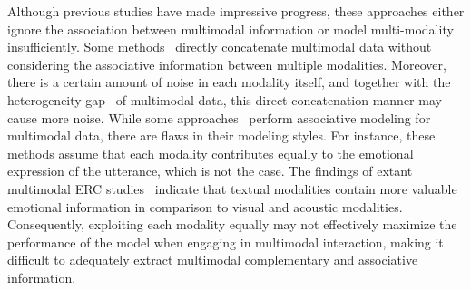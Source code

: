 \documentclass[journal]{IEEEtran}
\begin{document}
Although previous studies have made impressive progress, these approaches either ignore the association between multimodal information or model multi-modality insufficiently. Some methods~\cite{poria2017context,hazarika2018conversational,hazarika2018icon,majumder2019dialoguernn} directly concatenate multimodal data without considering the associative information between multiple modalities. Moreover, there is a certain amount of noise in each modality itself, and together with the heterogeneity gap~\cite{hazarika2020misa} of multimodal data, this direct concatenation manner may cause more noise. While some approaches~\cite{hu2021mmgcn,chen2021learning,hu2022mmdfn,chen2022modeling} perform associative modeling for multimodal data, there are flaws in their modeling styles. For instance, these methods assume that each modality contributes equally to the emotional expression of the utterance, which is not the case. The findings of extant multimodal ERC studies~\cite{mao2021dialoguetrm,yuan2023rbagcn} indicate that textual modalities contain more valuable emotional information in comparison to visual and acoustic modalities. Consequently, exploiting each modality equally may not effectively maximize the performance of the model when engaging in multimodal interaction, making it difficult to adequately extract multimodal complementary and associative information.
\end{document}
